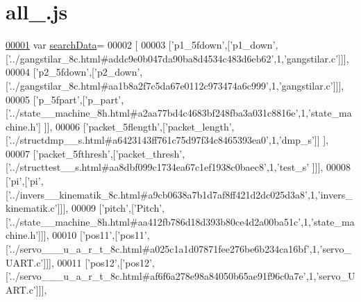\hypertarget{all__10_8js_source}{}\section{all\+\_.\+js}
\label{all__10_8js_source}

\begin{DoxyCode}
\hypertarget{all__10_8js_source.tex_l00001}{}\hyperlink{all__10_8js_ad01a7523f103d6242ef9b0451861231e}{00001} var \hyperlink{all__10_8js_ad01a7523f103d6242ef9b0451861231e}{searchData}=
00002 [
00003   [\textcolor{stringliteral}{'p1\_5fdown'},[\textcolor{stringliteral}{'p1\_down'},[\textcolor{stringliteral}{'../gangstilar\_8c.html#addc9e0b047da90ba8d4534c483d6eb62'},1,\textcolor{stringliteral}{'gangstilar.c'}]]],
00004   [\textcolor{stringliteral}{'p2\_5fdown'},[\textcolor{stringliteral}{'p2\_down'},[\textcolor{stringliteral}{'../gangstilar\_8c.html#aa1b8a2f7c5da67e0112c973474a6c999'},1,\textcolor{stringliteral}{'gangstilar.c'}]]],
00005   [\textcolor{stringliteral}{'p\_5fpart'},[\textcolor{stringliteral}{'p\_part'},[\textcolor{stringliteral}{'../state\_\_machine\_8h.html#a2aa77bd4c4683bf248fba3a031c8816e'},1,\textcolor{stringliteral}{'state\_machine.h'}]
      ]],
00006   [\textcolor{stringliteral}{'packet\_5flength'},[\textcolor{stringliteral}{'packet\_length'},[\textcolor{stringliteral}{'../structdmp\_\_s.html#a6423143ff761c75d97f34c8465393ea0'},1,\textcolor{stringliteral}{'dmp\_s'}]]
      ],
00007   [\textcolor{stringliteral}{'packet\_5fthresh'},[\textcolor{stringliteral}{'packet\_thresh'},[\textcolor{stringliteral}{'../structtest\_\_s.html#aa8dbf099c1734ea67c1ef1938c0baec8'},1,\textcolor{stringliteral}{'test\_s'}
      ]]],
00008   [\textcolor{stringliteral}{'pi'},[\textcolor{stringliteral}{'pi'},[\textcolor{stringliteral}{'../invers\_\_kinematik\_8c.html#a9cb0638a7b1d7af8ff421d2dc025d3a8'},1,\textcolor{stringliteral}{'invers\_kinematik.c'}]]],
00009   [\textcolor{stringliteral}{'pitch'},[\textcolor{stringliteral}{'Pitch'},[\textcolor{stringliteral}{'../state\_\_machine\_8h.html#aa412fb786d18d393b80ce4d2a00ba51c'},1,\textcolor{stringliteral}{'state\_machine.h'}]]],
00010   [\textcolor{stringliteral}{'pos11'},[\textcolor{stringliteral}{'pos11'},[\textcolor{stringliteral}{'../servo\_\_\_u\_a\_r\_t\_8c.html#a025c1a1d07871fee276be6b234ca16bf'},1,\textcolor{stringliteral}{'servo\_UART.c'}]]],
00011   [\textcolor{stringliteral}{'pos12'},[\textcolor{stringliteral}{'pos12'},[\textcolor{stringliteral}{'../servo\_\_\_u\_a\_r\_t\_8c.html#af6f6a278e98a84050b65ae91f96c0a7e'},1,\textcolor{stringliteral}{'servo\_UART.c'}]]],

\end{DoxyCode}
